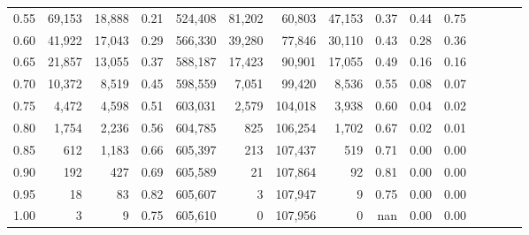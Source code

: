 \begin{tabular}{rrrcrrrrrrrrrrr}
0.55 &   69,153 &  18,888 &                                       0.21 &  524,408 &   81,202 &   60,803 &   47,153 &  0.37 &  0.44 &                         0.75 \\
0.60 &   41,922 &  17,043 &                                       0.29 &  566,330 &   39,280 &   77,846 &   30,110 &  0.43 &  0.28 &                         0.36 \\
0.65 &   21,857 &  13,055 &                                       0.37 &  588,187 &   17,423 &   90,901 &   17,055 &  0.49 &  0.16 &                         0.16 \\
0.70 &   10,372 &   8,519 &                                       0.45 &  598,559 &    7,051 &   99,420 &    8,536 &  0.55 &  0.08 &                         0.07 \\
0.75 &    4,472 &   4,598 &                                       0.51 &  603,031 &    2,579 &  104,018 &    3,938 &  0.60 &  0.04 &                         0.02 \\
0.80 &    1,754 &   2,236 &                                       0.56 &  604,785 &      825 &  106,254 &    1,702 &  0.67 &  0.02 &                         0.01 \\
0.85 &      612 &   1,183 &                                       0.66 &  605,397 &      213 &  107,437 &      519 &  0.71 &  0.00 &                         0.00 \\
0.90 &      192 &     427 &                                       0.69 &  605,589 &       21 &  107,864 &       92 &  0.81 &  0.00 &                         0.00 \\
0.95 &       18 &      83 &                                       0.82 &  605,607 &        3 &  107,947 &        9 &  0.75 &  0.00 &                         0.00 \\
1.00 &        3 &       9 &                                       0.75 &  605,610 &        0 &  107,956 &        0 &   nan &  0.00 &                         0.00 \\
\bottomrule
\end{tabular}
